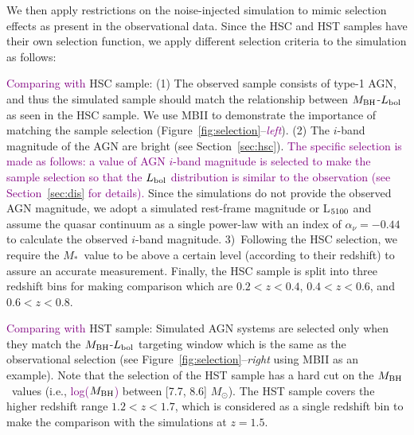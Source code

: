 \documentclass[twocolumn]{aastex631}
\newcommand{\todo}[1]{\textcolor{red}{[{\bf TODO}: #1]}}
\newcommand{\red}[1]{\textcolor{purple}{#1}}
\def\smass{{$M_*$}}
\def\mbh{$M_{\rm BH}$}
\begin{document}
We then apply restrictions on the noise-injected simulation to mimic selection effects as present in the observational data. Since the HSC and HST samples have their own selection function, we apply different selection criteria to the simulation as follows:

\red{Comparing with} HSC sample: (1) The observed sample consists of type-1 AGN, and thus the simulated sample should match the relationship between \mbh-$L_{\rm bol}$ as seen in the HSC sample. We use MBII to demonstrate the importance of matching the sample selection (Figure~\ref{fig:selection}--{\it \red{left}}). (2) The $i$-band magnitude of the AGN are bright (see Section~\ref{sec:hsc}). 
\red{The specific selection is made as follows: a value of AGN $i$-band magnitude is selected to make the sample selection so that the $L_{\rm bol}$ distribution is similar to the observation (see Section~\ref{sec:dis} for details). }
Since the simulations do not provide the observed AGN magnitude, we adopt a simulated rest-frame magnitude or L$_{\rm 5100}$ and assume the quasar continuum as a single power-law with an index of $\alpha_\nu=-0.44$~\citep{2001AJ....122..549V} to calculate the observed $i$-band magnitude.
 3)~Following the HSC selection, we require the \smass\ value to be above a certain level (according to their redshift) to assure an accurate measurement. Finally, the HSC sample is split into three redshift bins for making comparison which are $0.2<z<0.4$, $0.4<z<0.6$, and $0.6<z<0.8$.
 
\red{Comparing with} HST sample: Simulated AGN systems are selected only when they match the  \mbh-$L_{\rm bol}$ targeting window which is the same as the observational selection (see Figure~\ref{fig:selection}--{\it right} using MBII as an example). Note that the selection of the HST sample has a hard cut on the \mbh\ values (i.e., \red{log(\mbh)} between [7.7, 8.6] $M_{\odot}$). The HST sample covers the higher redshift range $1.2<z<1.7$, which is considered as a single redshift bin to make the comparison with the simulations at $z=1.5$.

\end{document}
